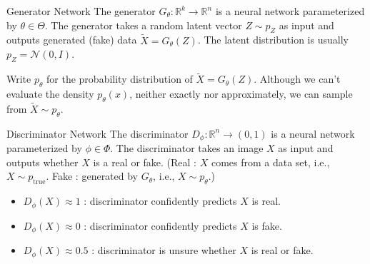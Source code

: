 \begin{frame}[allowframebreaks]

\begin{mydefinitionblock}{12.8}{Generator Network}
    The generator $G_{\theta}: \mathbb{R}^{k} \rightarrow \mathbb{R}^{n}$ is a neural network parameterized by $\theta \in \Theta$. The generator takes a random latent vector $Z \sim p_{Z}$ as input and outputs generated (fake) data $\tilde{X}=G_{\theta}(Z)$. The latent distribution is usually $p_{Z}=\mathcal{N}(0, I)$.

    Write $p_{\theta}$ for the probability distribution of $\tilde{X}=G_{\theta}(Z)$. Although we can't evaluate the density $p_{\theta}(x)$, neither exactly nor approximately, we can sample from $\tilde{X} \sim p_{\theta}$.
\end{mydefinitionblock}

\end{frame}

\begin{frame}[allowframebreaks]

\begin{mydefinitionblock}{12.9}{Discriminator Network}
    The discriminator $D_{\phi}: \mathbb{R}^{n} \rightarrow(0,1)$ is a neural network parameterized by $\phi \in \Phi$. The discriminator takes an image $X$ as input and outputs whether $X$ is a real or fake.
    (Real : $X$ comes from a data set, i.e., $X \sim p_{\text{true}}$. Fake : generated by $G_{\theta}$, i.e., $X \sim p_{\theta}$.)

    \begin{itemize}
        \item $D_{\phi}(X) \approx 1$ : discriminator confidently predicts $X$ is real.
        \item $D_{\phi}(X) \approx 0$ : discriminator confidently predicts $X$ is fake.
        \item $D_{\phi}(X) \approx 0.5$ : discriminator is unsure whether $X$ is real or fake.
    \end{itemize}
\end{mydefinitionblock}

\end{frame}

